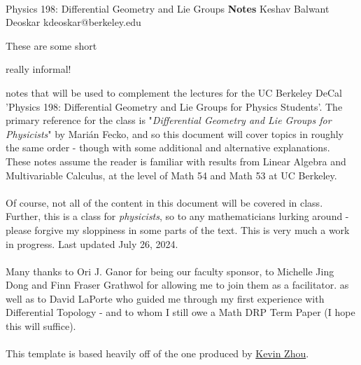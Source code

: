 \documentclass[11pt]{article}
\begin{document}
\thispagestyle{empty}
\bigskip \
\vspace{0.1cm}

\begin{center}
{\fontsize{22}{22} \selectfont Physics 198: Differential Geometry and Lie Groups}
\vskip 16pt
{\fontsize{36}{36} \selectfont \bf \sffamily Notes}
\vskip 24pt
{\fontsize{18}{18} \selectfont \rmfamily Keshav Balwant Deoskar} 
\vskip 6pt
{\fontsize{14}{14} \selectfont \ttfamily kdeoskar@berkeley.edu} 
\vskip 24pt
\end{center}



These are some short \begin{note} {really informal!} \end{note} notes that will be used to complement the lectures for the UC Berkeley DeCal 'Physics 198: Differential Geometry and Lie Groups for Physics Students'. The primary reference for the class is "\textit{Differential Geometry and Lie Groups for Physicists}" by Marián Fecko, and so this document will cover topics in roughly the same order - though with some additional and alternative explanations. These notes assume the reader is familiar with results from Linear Algebra and Multivariable Calculus, at the level of Math 54 and Math 53 at UC Berkeley.
\\
\\
Of course, not all of the content in this document will be covered in class. Further, this is a class for \emph{physicists}, so to any mathematicians lurking around - please forgive my sloppiness in some parts of the text. This is very much a work in progress. Last updated July 26, 2024.
\\
\\
Many thanks to Ori J. Ganor for being our faculty sponsor, to Michelle Jing Dong and Finn Fraser Grathwol for allowing me to join them as a facilitator. as well as to David LaPorte who guided me through my first experience with Differential Topology - and to whom I still owe a Math DRP Term Paper (I hope this will suffice).
\\
\\
This template is based heavily off of the one produced by \href{https://knzhou.github.io/}{Kevin Zhou}.

\tableofcontents 

\end{document}
